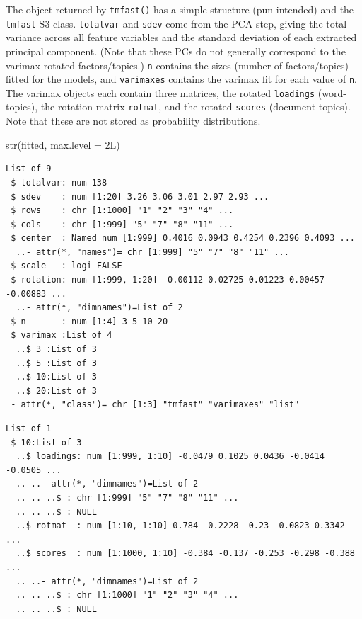 \documentclass[
]{article}
\newenvironment{Shaded}{\begin{snugshade}}{\end{snugshade}}
\newcommand{\AttributeTok}[1]{\textcolor[rgb]{0.40,0.45,0.13}{#1}}
\newcommand{\FunctionTok}[1]{\textcolor[rgb]{0.28,0.35,0.67}{#1}}
\newcommand{\NormalTok}[1]{\textcolor[rgb]{0.00,0.23,0.31}{#1}}
\newcommand{\SpecialCharTok}[1]{\textcolor[rgb]{0.37,0.37,0.37}{#1}}
\begin{document}
The object returned by \texttt{tmfast()} has a simple structure (pun
intended) and the \texttt{tmfast} S3 class. \texttt{totalvar} and
\texttt{sdev} come from the PCA step, giving the total variance across
all feature variables and the standard deviation of each extracted
principal component. (Note that these PCs do not generally correspond to
the varimax-rotated factors/topics.) \texttt{n} contains the sizes
(number of factors/topics) fitted for the models, and \texttt{varimaxes}
contains the varimax fit for each value of \texttt{n}. The varimax
objects each contain three matrices, the rotated \texttt{loadings}
(word-topics), the rotation matrix \texttt{rotmat}, and the rotated
\texttt{scores} (document-topics). Note that these are not stored as
probability distributions.

\begin{Shaded}
\begin{Highlighting}[]
\FunctionTok{str}\NormalTok{(fitted, }\AttributeTok{max.level =}\NormalTok{ 2L)}
\end{Highlighting}
\end{Shaded}

\begin{verbatim}
List of 9
 $ totalvar: num 138
 $ sdev    : num [1:20] 3.26 3.06 3.01 2.97 2.93 ...
 $ rows    : chr [1:1000] "1" "2" "3" "4" ...
 $ cols    : chr [1:999] "5" "7" "8" "11" ...
 $ center  : Named num [1:999] 0.4016 0.0943 0.4254 0.2396 0.4093 ...
  ..- attr(*, "names")= chr [1:999] "5" "7" "8" "11" ...
 $ scale   : logi FALSE
 $ rotation: num [1:999, 1:20] -0.00112 0.02725 0.01223 0.00457 -0.00883 ...
  ..- attr(*, "dimnames")=List of 2
 $ n       : num [1:4] 3 5 10 20
 $ varimax :List of 4
  ..$ 3 :List of 3
  ..$ 5 :List of 3
  ..$ 10:List of 3
  ..$ 20:List of 3
 - attr(*, "class")= chr [1:3] "tmfast" "varimaxes" "list"
\end{verbatim}

\begin{Shaded}
\end{Shaded}

\begin{verbatim}
List of 1
 $ 10:List of 3
  ..$ loadings: num [1:999, 1:10] -0.0479 0.1025 0.0436 -0.0414 -0.0505 ...
  .. ..- attr(*, "dimnames")=List of 2
  .. .. ..$ : chr [1:999] "5" "7" "8" "11" ...
  .. .. ..$ : NULL
  ..$ rotmat  : num [1:10, 1:10] 0.784 -0.2228 -0.23 -0.0823 0.3342 ...
  ..$ scores  : num [1:1000, 1:10] -0.384 -0.137 -0.253 -0.298 -0.388 ...
  .. ..- attr(*, "dimnames")=List of 2
  .. .. ..$ : chr [1:1000] "1" "2" "3" "4" ...
  .. .. ..$ : NULL
\end{verbatim}
\end{document}
